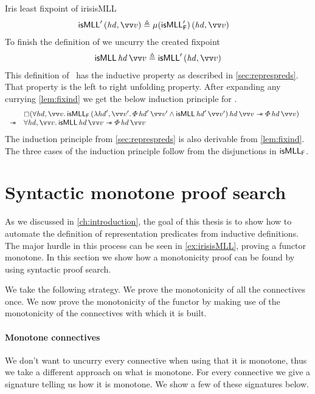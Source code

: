 \documentclass[thesis.tex]{subfiles}
\begin{document}
\begin{example}{Iris least fixpoint of \isMLL}{irisisMLL}
\begin{align*}
        \isMLL'\, (\hd, \vect{\val}) & \eqdef \lfp(\isMLL'_\hopred)\, (\hd, \vect{\val})
    \end{align*}
    To finish the definition of \isMLL we uncurry the created fixpoint
    \begin{align*}
        \isMLL\, \hd\, \vect{\val} \eqdef \isMLL'\, (\hd, \vect{\val})
    \end{align*}
    This definition of \isMLL\ has the inductive property as described in \cref*{sec:represpreds}. That property is the left to right unfolding property. After expanding any currying \cref*{lem:fixind} we get the below induction principle for \isMLL.
    \begin{align*}
         & \begin{array}{rl}
                     & \always(\All\hd,\vect{\val}.\isMLL_\hopred\,(\Lam\hd',\vect{\val}'. \pred\,\hd'\,\vect{\val}' \land \isMLL\,\hd'\,\vect{\val}')\,\hd\,\vect{\val} \wand \pred\,\hd\,\vect{\val}) \\
               \wand & \All\hd,\vect{\val}. \isMLL\,\hd\,\vect{\val} \wand \pred\,\hd\,\vect{\val}
           \end{array}
    \end{align*}
    The induction principle from \cref*{sec:represpreds} is also derivable from \cref*{lem:fixind}. The three cases of the induction principle follow from the disjunctions in $\textsf{\upshape isMLL}_{\textsf{\upshape F}}$.

\end{example}

\section{Syntactic monotone proof search}
\label{sec:monoproofsearch}%
As we discussed in \cref*{ch:introduction}, the goal of this thesis is to show how to automate the definition of representation predicates from inductive definitions. The major hurdle in this process can be seen in \cref*{ex:irisisMLL}, proving a functor monotone. In this section we show how a monotonicity proof can be found by using syntactic proof search.

We take the following strategy. We prove the monotonicity of all the connectives once. We now prove the monotonicity of the functor by making use of the monotonicity of the connectives with which it is built.

\paragraph*{Monotone connectives}
We don't want to uncurry every connective when using that it is monotone, thus we take a different approach on what is monotone. For every connective we give a signature telling us how it is monotone. We show a few of these signatures below.
\end{document}
